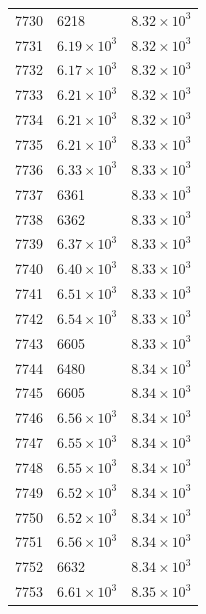 \begin{table}[H]
\begin{tabular}{lll}
7730 & 6218 & $\displaystyle 8.32 \times 10^{3}$ \\
7731 & $\displaystyle 6.19 \times 10^{3}$ & $\displaystyle 8.32 \times 10^{3}$ \\
7732 & $\displaystyle 6.17 \times 10^{3}$ & $\displaystyle 8.32 \times 10^{3}$ \\
7733 & $\displaystyle 6.21 \times 10^{3}$ & $\displaystyle 8.32 \times 10^{3}$ \\
7734 & $\displaystyle 6.21 \times 10^{3}$ & $\displaystyle 8.32 \times 10^{3}$ \\
7735 & $\displaystyle 6.21 \times 10^{3}$ & $\displaystyle 8.33 \times 10^{3}$ \\
7736 & $\displaystyle 6.33 \times 10^{3}$ & $\displaystyle 8.33 \times 10^{3}$ \\
7737 & 6361 & $\displaystyle 8.33 \times 10^{3}$ \\
7738 & 6362 & $\displaystyle 8.33 \times 10^{3}$ \\
7739 & $\displaystyle 6.37 \times 10^{3}$ & $\displaystyle 8.33 \times 10^{3}$ \\
7740 & $\displaystyle 6.40 \times 10^{3}$ & $\displaystyle 8.33 \times 10^{3}$ \\
7741 & $\displaystyle 6.51 \times 10^{3}$ & $\displaystyle 8.33 \times 10^{3}$ \\
7742 & $\displaystyle 6.54 \times 10^{3}$ & $\displaystyle 8.33 \times 10^{3}$ \\
7743 & 6605 & $\displaystyle 8.33 \times 10^{3}$ \\
7744 & 6480 & $\displaystyle 8.34 \times 10^{3}$ \\
7745 & 6605 & $\displaystyle 8.34 \times 10^{3}$ \\
7746 & $\displaystyle 6.56 \times 10^{3}$ & $\displaystyle 8.34 \times 10^{3}$ \\
7747 & $\displaystyle 6.55 \times 10^{3}$ & $\displaystyle 8.34 \times 10^{3}$ \\
7748 & $\displaystyle 6.55 \times 10^{3}$ & $\displaystyle 8.34 \times 10^{3}$ \\
7749 & $\displaystyle 6.52 \times 10^{3}$ & $\displaystyle 8.34 \times 10^{3}$ \\
7750 & $\displaystyle 6.52 \times 10^{3}$ & $\displaystyle 8.34 \times 10^{3}$ \\
7751 & $\displaystyle 6.56 \times 10^{3}$ & $\displaystyle 8.34 \times 10^{3}$ \\
7752 & 6632 & $\displaystyle 8.34 \times 10^{3}$ \\
7753 & $\displaystyle 6.61 \times 10^{3}$ & $\displaystyle 8.35 \times 10^{3}$ \\

\end{tabular}
\end{table}
